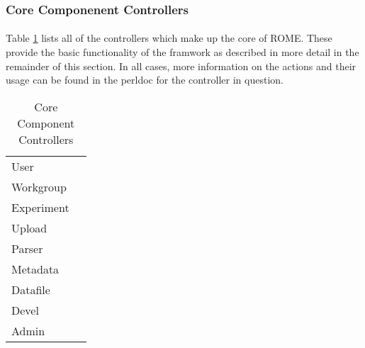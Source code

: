 \subsubsection{Core Componenent Controllers}
\label{sec:core_component_controllers}

\paragraph{}
Table \ref{tab:core_component_controllers} lists all of the controllers which make up the core of ROME. These provide the basic functionality of the framwork as described in more detail in the remainder of this section. In all cases, more information on the actions and their usage can be found in the perldoc for the controller in question.

\begin{table}
\caption{Core Component Controllers}
\label{tab:core_component_controllers}
\begin{footnotesize}
\begin{tabular}{ll}
User\\
Workgroup\\
Experiment\\
Upload\\
Parser\\
Metadata\\
Datafile\\
Devel\\
Admin\\
\end{tabular}
\end{footnotesize}
\end{table}



